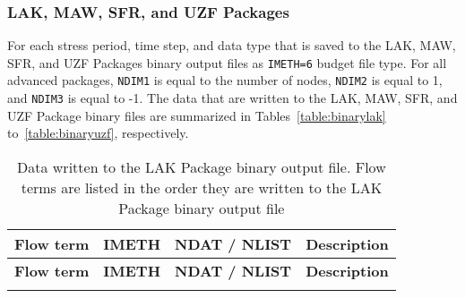 \subsubsection{LAK, MAW, SFR, and UZF Packages}

\vspace{5mm}
For each stress period, time step, and data type that is saved to the LAK, MAW, SFR, and UZF Packages binary output files as \texttt{IMETH=6} budget file type. For all advanced packages, \texttt{NDIM1} is equal to the number of nodes, \texttt{NDIM2} is equal to 1, and \texttt{NDIM3} is equal to -1. The data that are written to the LAK, MAW, SFR, and UZF Package binary files are summarized in Tables~\ref{table:binarylak}
 to~\ref{table:binaryuzf}, respectively.


\begin{longtable}{p{3.5cm} p{2cm} p{3.5cm} p{6.5cm}}
\caption{Data written to the LAK Package binary output file. Flow terms are listed in the order they are written to the LAK Package binary output file} \tabularnewline
\hline
\hline
\textbf{Flow term} & \textbf{IMETH} & \textbf{NDAT / NLIST} & \textbf{Description} \\
\hline
\endfirsthead

\hline
\hline
\textbf{Flow term} & \textbf{IMETH} & \textbf{NDAT / NLIST} & \textbf{Description} \\
\hline
\endhead

\hline
\endfoot


\end{longtable}

